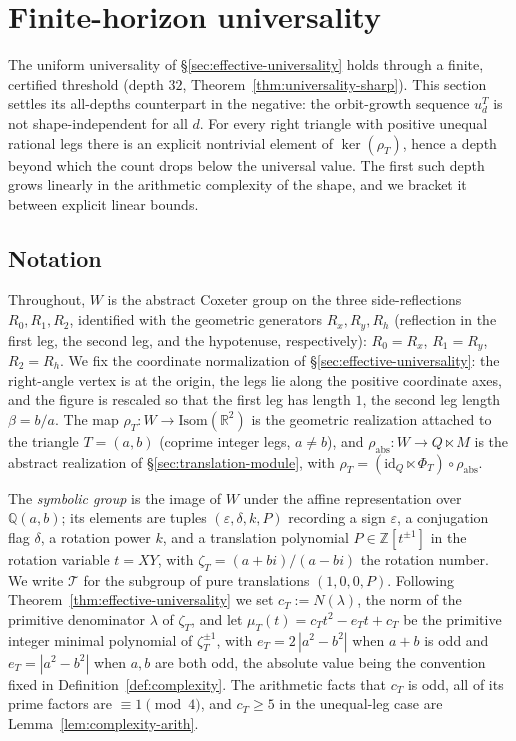 \documentclass[11pt]{article}
\theoremstyle{plain}
\theoremstyle{definition}
\theoremstyle{remark}
\begin{document}
\section{Finite-horizon universality}
\label{sec:non-universality}

The uniform universality of \S\ref{sec:effective-universality} holds
through a finite, certified threshold (depth $32$,
Theorem~\ref{thm:universality-sharp}). This section settles its all-depths
counterpart in the negative: the orbit-growth sequence $u_d^T$ is not
shape-independent for all $d$. For every right triangle with positive
unequal rational legs there is an explicit nontrivial element of
$\ker(\rho_T)$, hence a depth beyond which the count drops below the
universal value. The first such depth grows linearly in the arithmetic
complexity of the shape, and we bracket it between explicit linear bounds.

\subsection*{Notation}

Throughout, $W$ is the abstract Coxeter group on the three
side-reflections $R_0, R_1, R_2$, identified with the geometric
generators $R_x, R_y, R_h$ (reflection in the first leg, the second leg,
and the hypotenuse, respectively): $R_0 = R_x$, $R_1 = R_y$, $R_2 = R_h$.
We fix the coordinate normalization of \S\ref{sec:effective-universality}:
the right-angle vertex is at the origin, the legs lie along the positive
coordinate axes, and the figure is rescaled so that the first leg has
length $1$, the second leg length $\beta = b/a$. The map
$\rho_T \colon W \to \mathrm{Isom}(\mathbb{R}^2)$ is the geometric
realization attached to the triangle $T = (a,b)$ (coprime integer legs,
$a \neq b$), and $\rho_{\mathrm{abs}} \colon W \to Q \ltimes M$ is the
abstract realization of \S\ref{sec:translation-module}, with
$\rho_T = (\mathrm{id}_Q \ltimes \Phi_T) \circ \rho_{\mathrm{abs}}$.

The \emph{symbolic group} is the image of $W$ under the affine
representation over $\mathbb{Q}(a,b)$; its elements are tuples
$(\varepsilon,\delta,k,P)$ recording a sign $\varepsilon$, a conjugation
flag $\delta$, a rotation power $k$, and a translation polynomial
$P \in \mathbb{Z}[t^{\pm 1}]$ in the rotation variable $t = XY$, with
$\zeta_T = (a+bi)/(a-bi)$ the rotation number. We write $\mathcal{T}$ for
the subgroup of pure translations $(1,0,0,P)$. Following
Theorem~\ref{thm:effective-universality} we set $c_T := N(\lambda)$, the
norm of the primitive denominator $\lambda$ of $\zeta_T$, and let
$\mu_T(t) = c_T t^2 - e_T t + c_T$ be the primitive integer minimal
polynomial of $\zeta_T^{\pm 1}$, with $e_T = 2\,|a^2-b^2|$ when $a+b$ is odd
and $e_T = |a^2-b^2|$ when $a,b$ are both odd, the absolute value being the
convention fixed in Definition~\ref{def:complexity}. The arithmetic facts that
$c_T$ is odd, all of its prime factors are $\equiv 1 \pmod 4$, and
$c_T \ge 5$ in the unequal-leg case are
Lemma~\ref{lem:complexity-arith}.
\end{document}
